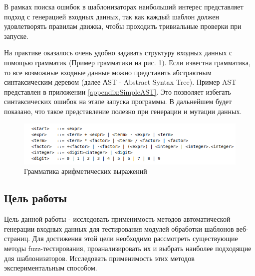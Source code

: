 \documentclass[a4paper]{article}
\begin{document}
В рамках поиска ошибок в шаблонизаторах наибольший интерес представляет подход с генерацией входных данных, так как каждый шаблон должен удовлетворять правилам движка, чтобы проходить тривиальные проверки при запуске.

На практике оказалось очень удобно задавать структуру входных данных с помощью грамматик (Пример грамматики на рис. \ref{SimpleGrammar}). Если известна грамматика, то все возможные входные данные можно представить абстрактным синтаксическим деревом (далее АST - Abstract Syntax Tree). Пример AST представлен в приложении \ref{appendix:SimpleAST}. Это позволяет избегать синтаксических ошибок на этапе запуска программы. В дальнейшем будет показано, что такое представление полезно при генерации и мутации данных.

\begin{figure}[ht!]
\includegraphics[width=180mm]{Expressions_Grammar.png}
\caption{Грамматика арифметических выражений}
\label{SimpleGrammar}
\end{figure}


\subsection{Цель работы}

Цель данной работы - исследовать применимость методов автоматической генерации входных данных для тестирования модулей обработки шаблонов веб-страниц. Для достижения этой цели необходимо рассмотреть существующие методы fuzz-тестирования, проанализировать их и выбрать наиболее подходящие для шаблонизаторов. Исследовать применимость этих методов экспериментальным способом.
\end{document}
